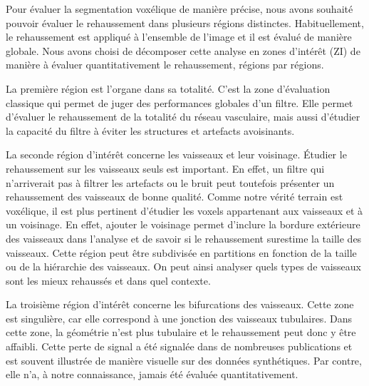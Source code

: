 Pour évaluer la segmentation voxélique de manière précise, nous avons souhaité pouvoir évaluer le rehaussement dans plusieurs régions distinctes. Habituellement, le rehaussement est appliqué à l'ensemble de l'image et il est évalué de manière globale. Nous avons choisi de décomposer cette analyse en zones d'intérêt (ZI) de manière à évaluer quantitativement le rehaussement, régions par régions.

La première région est l'organe dans sa totalité. C'est la zone d'évaluation classique qui permet de juger des performances globales d'un filtre. Elle permet d'évaluer le rehaussement de la totalité du réseau vasculaire, mais aussi d'étudier la capacité du filtre à éviter les structures et artefacts avoisinants.

La seconde région d'intérêt concerne les vaisseaux et leur voisinage. Étudier le rehaussement sur les vaisseaux seuls est important. En effet, un filtre qui n'arriverait pas à filtrer les artefacts ou le bruit peut toutefois présenter un rehaussement des vaisseaux de bonne qualité. Comme notre vérité terrain est voxélique, il est plus pertinent d'étudier les voxels appartenant aux vaisseaux et à un voisinage. En effet, ajouter le voisinage permet d'inclure la bordure extérieure des vaisseaux dans l'analyse et de savoir si le rehaussement surestime la taille des vaisseaux. Cette région peut être subdivisée en partitions en fonction de la taille ou de la hiérarchie des vaisseaux. On peut ainsi analyser quels types de vaisseaux sont les mieux rehaussés et dans quel contexte.

La troisième région d'intérêt concerne les bifurcations des vaisseaux. Cette zone est singulière, car elle correspond à une jonction des vaisseaux tubulaires. Dans cette zone, la géométrie n'est plus tubulaire et le rehaussement peut donc y être affaibli. Cette perte de signal a été signalée dans de nombreuses publications et est souvent illustrée de manière visuelle sur des données synthétiques. Par contre, elle n'a, à notre connaissance, jamais été évaluée quantitativement.

